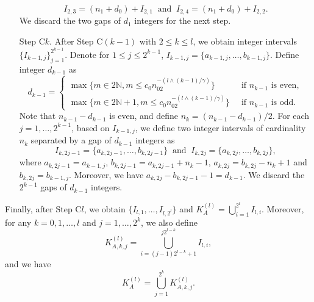 \documentclass[11pt]{article}
\theoremstyle{plain}
\theoremstyle{definition}
\begin{document}
\begin{enumerate}
    \begin{equation*}
        I_{2,3} = (n_1 + d_0) + I_{2,1} \;\; \text{and} \;\; I_{2,4} = (n_1 + d_0) + I_{2,2}.
    \end{equation*}
    We discard the two gaps of $d_1$ integers for the next step.
    \item[Step C$k$.] After Step C$(k-1)$ with $2 \leq k \leq l$, we obtain integer intervals $\{I_{k-1, j}\}_{j = 1}^{2^{k-1}}$. Denote for $1 \leq j \leq 2^{k-1}$, $I_{k-1, j} = \{a_{k-1,j}, \dots, b_{k-1,j}\}$.
    Define integer $d_{k-1}$ as
    \begin{equation}\label{eq:gap_size_j-1}
        d_{k-1} = \begin{cases}
            \max\{m \in 2\mathbb{N}, m \leq c_0n_02^{-(l \wedge (k-1)/\gamma)}\} \;\; &\text{if $n_{k-1}$ is even},\\
            \max\{m \in 2\mathbb{N}+1, m \leq c_0n_02^{-(l \wedge (k-1)/\gamma)}\} \;\; &\text{if $n_{k-1}$ is odd}.
        \end{cases}
    \end{equation}
    Note that $n_{k-1} - d_{k-1}$ is even, and define $n_k = (n_{k-1} - d_{k-1})/2$. For each $j = 1, \dots, 2^{k-1}$, based on $I_{k-1,j}$, we define two integer intervals of cardinality $n_k$ separated by a gap of $d_{k-1}$ integers as
    \begin{equation*}
        I_{k,2j-1} = \{a_{k,2j-1}, \dots, b_{k,2j-1}\} \;\; \text{and} \;\; I_{k,2j} = \{a_{k,2j}, \dots, b_{k,2j}\},
    \end{equation*}
    where $a_{k,2j-1} = a_{k-1,j}$, $b_{k,2j-1} = a_{k,2j-1} + n_k - 1$, $a_{k,2j} = b_{k,2j}-n_k+1$ and $b_{k,2j} = b_{k-1,j}$. Moreover, we have $a_{k,2j} - b_{k,2j-1} - 1 = d_{k-1}$.
    We discard the $2^{k-1}$ gaps of $d_{k-1}$ integers.
\end{enumerate}
Finally, after Step C$l$, we obtain $\{I_{l,1}, \dots, I_{l,2^l}\}$ and $K_A^{(l)} = \bigcup_{i = 1}^{2^l}I_{l,i}$. Moreover, for any $k = 0, 1, \dots, l$ and $j = 1, \dots, 2^k$, we also define
\begin{equation}\label{eq:cantor_decomp_1}
    K_{A,k,j}^{(l)} = \bigcup_{i = (j-1)2^{l-k}+1}^{j2^{l-k}}I_{l,i},
\end{equation}
and we have
\begin{equation}\label{eq:cantor_decomp_2}
    K_A^{(l)} = \bigcup_{j=1}^{2^k}K_{A,k,j}^{(l)}.
\end{equation}
\end{document}
